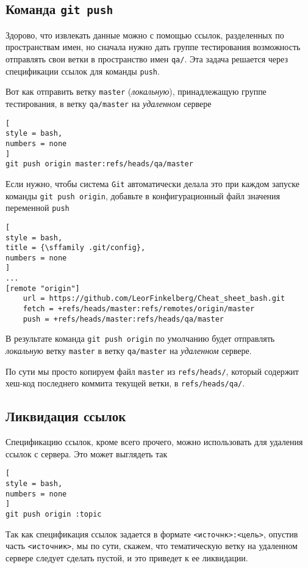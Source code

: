 \documentclass[%
	11pt,
	a4paper,
	utf8,
		]{article}
\begin{document}
\subsection{Команда \texttt{git push}}

Здорово, что извлекать данные можно с помощью ссылок, разделенных по пространствам имен, но сначала нужно дать группе тестирования возможность отправлять свои ветки в пространство имен \verb|qa/|. Эта задача решается через спецификации ссылок для команды \texttt{push}.

Вот как отправить ветку \texttt{master} (\emph{локальную}), принадлежащую группе тестирования, в ветку \verb|qa/master| на \emph{удаленном} сервере
\begin{lstlisting}[
style = bash,
numbers = none
]
git push origin master:refs/heads/qa/master
\end{lstlisting}

Если нужно, чтобы система \texttt{Git} автоматически делала это при каждом запуске команды \texttt{git push origin}, добавьте в конфигурационный файл значения переменной \texttt{push}
\begin{lstlisting}[
style = bash,
title = {\sffamily .git/config},
numbers = none
]
...
[remote "origin"]
    url = https://github.com/LeorFinkelberg/Cheat_sheet_bash.git
    fetch = +refs/heads/master:refs/remotes/origin/master
    push = +refs/heads/master:refs/heads/qa/master
\end{lstlisting}

В результате команда \texttt{git push origin} по умолчанию будет отправлять \emph{локальную} ветку \texttt{master} в ветку \verb|qa/master| на \emph{удаленном} сервере.

По сути мы просто копируем файл \texttt{master} из \verb|refs/heads/|, который содержит хеш-код последнего коммита текущей ветки, в \verb|refs/heads/qa/|.

\subsection{Ликвидация ссылок}

Спецификацию ссылок, кроме всего прочего, можно использовать для удаления ссылок с сервера. Это может выглядеть так
\begin{lstlisting}[
style = bash,
numbers = none
]
git push origin :topic
\end{lstlisting}

Так как спецификация ссылок задается в формате \verb|<источнк>:<цель>|, опустив часть \verb|<источник>|, мы по сути, скажем, что тематическую ветку на удаленном сервере следует сделать пустой, и это приведет к ее ликвидации.
\end{document}
